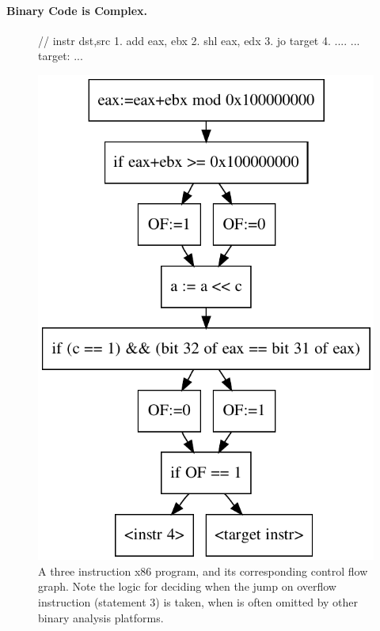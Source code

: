 \paragraph{Binary Code is Complex.}

\begin{figure}
\begin{minipage}{.4\linewidth}
\begin{code}
// instr dst,src
1. add eax, ebx
2. shl eax, edx
3. jo target
4. ....
...
target: ...
\end{code}
\end{minipage}
\begin{minipage}[c]{.5\linewidth}
\includegraphics[scale=.5]{fig/add-shl}
\end{minipage}
\caption{A three instruction x86 program, and its corresponding
  control flow graph.  Note the logic for deciding when the jump on
  overflow instruction (statement 3) is taken, when is often omitted
  by other binary analysis platforms. }
\label{vine:shl-add}
\end{figure}

